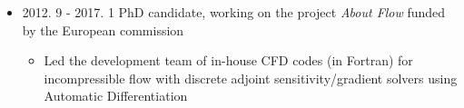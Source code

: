 \documentclass[letterpaper]{article}
\begin{document}
\begin{itemize}
\item 2012. 9 - 2017. 1  \hspace{2pt} PhD candidate, working on the project \textsl{About Flow} funded by the European commission
		\begin{itemize}
		\item Led the development team of in-house CFD codes (in Fortran) for incompressible flow with discrete adjoint sensitivity/gradient solvers using Automatic Differentiation

\end{itemize}
\end{itemize}
\end{document}
